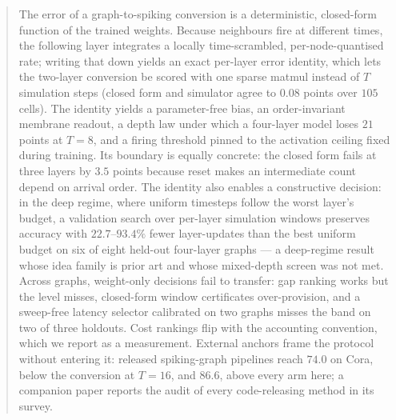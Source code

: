 \begin{abstract}
The error of a graph-to-spiking conversion is a deterministic, closed-form function of the trained
weights. Because neighbours fire at different times, the following layer integrates a locally
time-scrambled, per-node-quantised rate; writing that down yields an exact per-layer error identity,
which lets the two-layer conversion be scored with one sparse matmul instead of $T$ simulation steps
(closed form and simulator agree to $0.08$ points over $105$ cells). The identity yields a
parameter-free bias, an order-invariant membrane readout, a depth law under which a four-layer model
loses $21$ points at $T=8$, and a firing threshold pinned to the activation ceiling fixed during
training. Its boundary is equally concrete: the closed form fails at three layers by $3.5$ points
because reset makes an intermediate count depend on arrival order. The identity also enables a
constructive decision: in the deep regime, where uniform timesteps follow the worst layer's budget,
a validation search over per-layer simulation windows preserves accuracy with $22.7$--$93.4\%$
fewer layer-updates than the best uniform budget on six of eight held-out four-layer graphs --- a
deep-regime result whose idea family is prior art and whose mixed-depth screen was not met. Across
graphs, weight-only decisions fail to transfer: gap ranking works but the level misses, closed-form
window certificates over-provision, and a sweep-free latency selector calibrated on two graphs
misses the band on two of three holdouts. Cost rankings flip with the accounting convention, which
we report as a measurement. External anchors frame the protocol without entering it: released
spiking-graph pipelines reach $74.0$ on Cora, below the conversion at $T=16$, and $86.6$, above
every arm here; a companion paper reports the audit of every code-releasing method in its survey.

\end{abstract}
